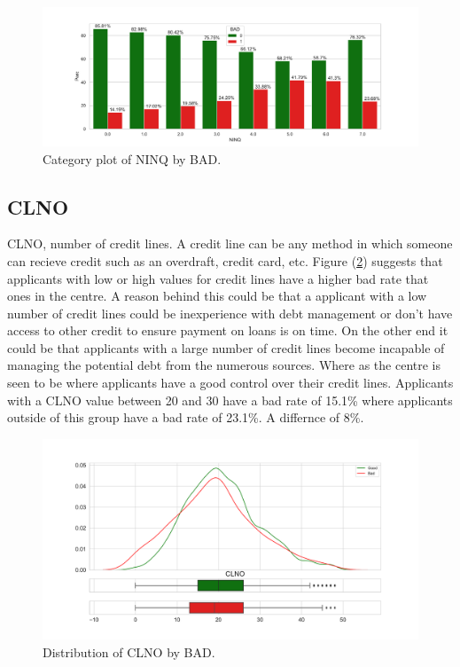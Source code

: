 \begin{figure}[H]
	\centering
	\includegraphics[scale=0.40]{figs/ninq_cat.pdf}
	\caption{Category plot of NINQ by BAD. \label{ninq_cat}}
\end{figure}

\subsection*{CLNO}

CLNO,  number of credit lines. A credit line can be any method in which someone can recieve credit such as an overdraft,  credit card,  etc. Figure (\ref{clno_dist}) suggests that applicants with low or high values for credit lines have a higher bad rate that ones in the centre. A reason behind this could be that a applicant with a low number of credit lines could be inexperience with debt management or don't have access to other credit to ensure payment on loans is on time. On the other end it could be that applicants with a large number of credit lines become incapable of managing the potential debt from the numerous sources. Where as the centre is seen to be where applicants have a good control over their credit lines. Applicants with a CLNO value between 20 and 30 have a bad rate of 15.1\% where applicants outside of this group have a bad rate of 23.1\%. A differnce of 8\%.

\begin{figure}[H]
	\centering
	\includegraphics[scale=0.40]{figs/clno_dist.pdf}
	\caption{Distribution of CLNO by BAD. \label{clno_dist}}
\end{figure}

